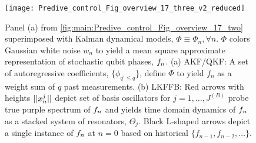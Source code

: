 \begin{figure} [tp]
    \texttt{[image: Predive\_control\_Fig\_overview\_17\_three\_v2\_reduced]}
    \caption{\label{Predive_control_Fig_overview_17_three} Panel (a) from \cref{fig:main:Predive_control_Fig_overview_17_two} superimposed with Kalman dynamical models, $\Phi \equiv \Phi_n, \forall n$.  $\Phi$ colors Gaussian white noise $w_n$ to yield  a mean square approximate representation of stochastic qubit phases, $f_n$. (a) AKF/QKF: A set of autoregressive coefficients, $\{\phi_{q'\leq q}\}$, define $\Phi$ to yield $f_n$ as a weight sum of $q$ past measurements. (b) LKFFB: Red arrows with heights $||x^j_n||$ depict set of basis oscillators for $j = 1, \hdots, J^{(B)}$ probe true purple spectrum of $f_n$ and yields time domain dynamics of $f_n$ as a stacked system of resonators, $\Theta_j$. Black L-shaped arrows depict a single instance of $f_n$ at $n=0$ based on historical $\{f_{n-1}, f_{n-2}, \hdots\} $.} 	
\end{figure}

